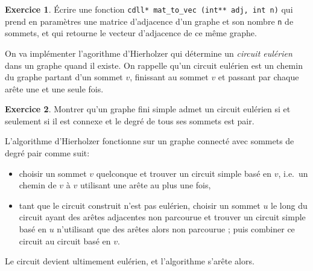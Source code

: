 \documentclass[french,a4paper]{article}
\theoremstyle{definition}
\newtheorem{exercise}{Exercice}
\theoremstyle{remark}
\newcommand{\inlinec}[1]{\lstinline[style=C]°#1°}
\begin{document}
\begin{exercise}
  \'Ecrire une fonction \inlinec{cdll* mat_to_vec (int** adj, int n)}
  qui prend en paramètres une matrice d'adjacence d'un graphe et son
  nombre \inlinec{n} de sommets, et qui retourne le vecteur
  d'adjacence de ce même graphe.
\end{exercise}

\medskip

On va implémenter l'agorithme d'Hierholzer qui détermine un {\em
  circuit eulérien} dans un graphe quand il existe. On rappelle qu'un
circuit eulérien est un chemin du graphe partant d'un sommet $v$,
finissant au sommet $v$ et passant par chaque arête une et une seule
fois.

\begin{exercise}
  Montrer qu'un graphe fini simple admet un circuit eulérien si et
  seulement si il est connexe et le degré de tous ses sommets est pair.
\end{exercise}

L'algorithme d'Hierholzer fonctionne sur un graphe connecté avec
sommets de degré pair comme suit:
\begin{itemize}
\item choisir un sommet $v$ quelconque et trouver un circuit simple
  basé en $v$, i.e.\ un chemin de $v$ à $v$ utilisant une arête au
  plus une fois,
\item tant que le circuit construit n'est pas eulérien, choisir un
  sommet $u$ le long du circuit ayant des arêtes adjacentes non
  parcourue et trouver un circuit simple basé en $u$ n'utilisant que
  des arêtes alors non parcourue ; puis combiner ce circuit au circuit
  basé en $v$.
\end{itemize}
Le circuit devient ultimement eulérien, et l'algorithme s'arête alors.
\end{document}
